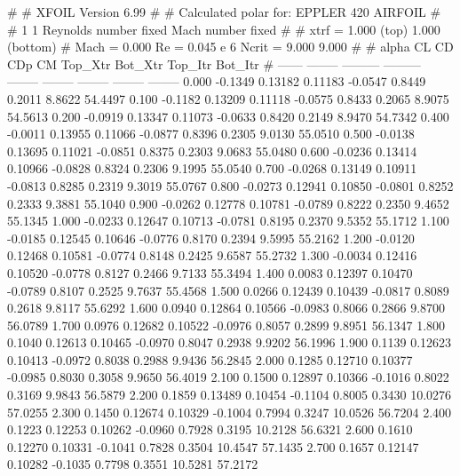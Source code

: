 #  
#       XFOIL         Version 6.99
#  
# Calculated polar for: EPPLER 420 AIRFOIL                              
#  
# 1 1 Reynolds number fixed          Mach number fixed         
#  
# xtrf =   1.000 (top)        1.000 (bottom)  
# Mach =   0.000     Re =     0.045 e 6     Ncrit =   9.000  9.000
#  
#   alpha    CL        CD       CDp       CM     Top_Xtr  Bot_Xtr  Top_Itr  Bot_Itr
#  ------ -------- --------- --------- -------- -------- -------- -------- --------
   0.000  -0.1349   0.13182   0.11183  -0.0547   0.8449   0.2011   8.8622  54.4497
   0.100  -0.1182   0.13209   0.11118  -0.0575   0.8433   0.2065   8.9075  54.5613
   0.200  -0.0919   0.13347   0.11073  -0.0633   0.8420   0.2149   8.9470  54.7342
   0.400  -0.0011   0.13955   0.11066  -0.0877   0.8396   0.2305   9.0130  55.0510
   0.500  -0.0138   0.13695   0.11021  -0.0851   0.8375   0.2303   9.0683  55.0480
   0.600  -0.0236   0.13414   0.10966  -0.0828   0.8324   0.2306   9.1995  55.0540
   0.700  -0.0268   0.13149   0.10911  -0.0813   0.8285   0.2319   9.3019  55.0767
   0.800  -0.0273   0.12941   0.10850  -0.0801   0.8252   0.2333   9.3881  55.1040
   0.900  -0.0262   0.12778   0.10781  -0.0789   0.8222   0.2350   9.4652  55.1345
   1.000  -0.0233   0.12647   0.10713  -0.0781   0.8195   0.2370   9.5352  55.1712
   1.100  -0.0185   0.12545   0.10646  -0.0776   0.8170   0.2394   9.5995  55.2162
   1.200  -0.0120   0.12468   0.10581  -0.0774   0.8148   0.2425   9.6587  55.2732
   1.300  -0.0034   0.12416   0.10520  -0.0778   0.8127   0.2466   9.7133  55.3494
   1.400   0.0083   0.12397   0.10470  -0.0789   0.8107   0.2525   9.7637  55.4568
   1.500   0.0266   0.12439   0.10439  -0.0817   0.8089   0.2618   9.8117  55.6292
   1.600   0.0940   0.12864   0.10566  -0.0983   0.8066   0.2866   9.8700  56.0789
   1.700   0.0976   0.12682   0.10522  -0.0976   0.8057   0.2899   9.8951  56.1347
   1.800   0.1040   0.12613   0.10465  -0.0970   0.8047   0.2938   9.9202  56.1996
   1.900   0.1139   0.12623   0.10413  -0.0972   0.8038   0.2988   9.9436  56.2845
   2.000   0.1285   0.12710   0.10377  -0.0985   0.8030   0.3058   9.9650  56.4019
   2.100   0.1500   0.12897   0.10366  -0.1016   0.8022   0.3169   9.9843  56.5879
   2.200   0.1859   0.13489   0.10454  -0.1104   0.8005   0.3430  10.0276  57.0255
   2.300   0.1450   0.12674   0.10329  -0.1004   0.7994   0.3247  10.0526  56.7204
   2.400   0.1223   0.12253   0.10262  -0.0960   0.7928   0.3195  10.2128  56.6321
   2.600   0.1610   0.12270   0.10331  -0.1041   0.7828   0.3504  10.4547  57.1435
   2.700   0.1657   0.12147   0.10282  -0.1035   0.7798   0.3551  10.5281  57.2172
